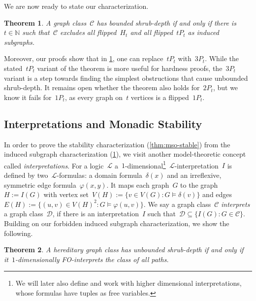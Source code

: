 \documentclass[11pt]{article}      \usepackage[margin=1in]{geometry}  \usepackage{microtype}
\newtheorem{theorem}{Theorem}[section]
\theoremstyle{definition}
\newcommand{\N}[0]{\mathrm{\mathbb{N}}}
\renewcommand{\phi}{\varphi}
\newcommand{\LL}{\mathcal{L}}
\newcommand{\DD}{\mathcal{D}}
\newcommand{\CC}{\mathcal{C}}
\begin{document}
We are now ready to state our characterization.

\begin{theorem}\label{thm:subgraphs}
  A graph class~$\CC$ has bounded shrub-depth if and only if there is~$t\in \N$ such that~$\CC$ excludes all flipped~$H_t$ and
  all flipped~$tP_t$ as induced subgraphs.
\end{theorem}

Moreover, our proofs show that in \cref{thm:subgraphs}, one can replace~$tP_t$ with~$3P_t$. 
While the stated~$tP_t$ variant of the theorem is more useful for hardness proofs, the~$3P_t$ variant is a step towards finding the simplest obstructions that cause unbounded shrub-depth.
It remains open whether the theorem also holds for~$2P_t$, but we know it fails for~$1P_t$, as every graph on~$t$ vertices is a flipped~$1P_t$.


\subsection*{Interpretations and Monadic Stability}
In order to prove the stability characterization (\cref{thm:mso-stable}) from the induced subgraph characterization (\cref{thm:subgraphs}), we visit another model-theoretic concept called \emph{interpretations}.
For a logic~$\LL$ a~$1$-dimensional\footnote{We will later also define and work with higher dimensional interpretations, whose formulas have tuples as free variables.}~$\LL$-interpretation~$I$ is defined by two~$\LL$-formulas: a domain formula~$\delta(x)$ and an irreflexive, symmetric edge formula~$\phi(x,y)$. 
It maps each graph~$G$ to the graph~$H := I(G)$ with vertex set~$V(H) := \{ v \in V(G) : G\models \delta(v) \}$ and edges~$E(H) := \{(u,v) \in V(H)^2 : G\models \phi(u,v)\}$.
We say a graph class~$\CC$ \emph{interprets} a graph class~$\DD$, if there is an interpretation~$I$ such that~$\DD \subseteq \{ I(G) : G\in \CC \}$.
Building on our forbidden induced subgraph characterization, we show the following.

\begin{theorem}\label{thm:interpreting-paths}
  A hereditary graph class has unbounded shrub-depth if and only if it~$1$-dimensionally FO-interprets the class of all paths.
\end{theorem}
\end{document}
